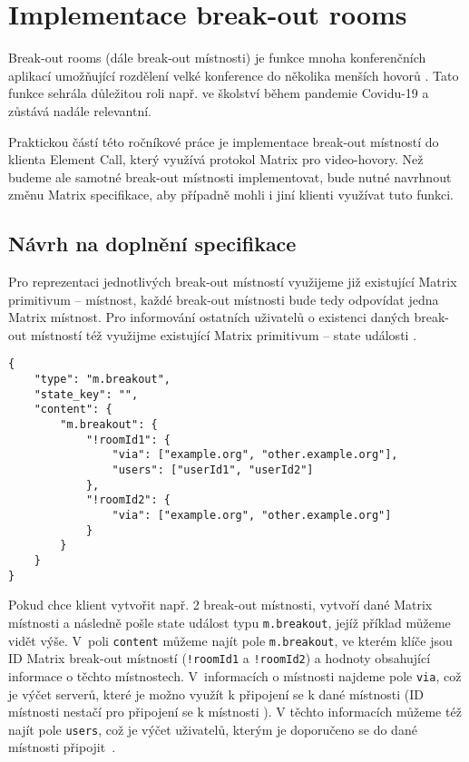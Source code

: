 \section{Implementace break-out rooms}\label{breakoutRooms}

Break-out rooms (dále break-out místnosti) je funkce mnoha konferenčních
aplikací umožňující rozdělení velké konference do několika menších hovorů
\parencite{Zoom-EnablingMeetingBreakoutRooms,Microsoft-UseBreakoutRoomsInMSTeamsMeetings}.
Tato funkce sehrála důležitou roli např. ve školství během pandemie Covidu-19
\parencite{AhmedKhalid-TheImpactOfUtilizingBreakoutRooms,Agustina-ZoomBreakoutRoomsForStudents}
a zůstává nadále relevantní.

Praktickou částí této ročníkové práce je implementace break-out místností do
klienta Element Call, který využívá protokol Matrix pro video-hovory. Než budeme
ale samotné break-out místnosti implementovat, bude nutné navrhnout změnu Matrix
specifikace, aby případně mohli i jiní klienti využívat tuto funkci.

\subsection{Návrh na doplnění specifikace}\label{breakoutRoomsMSC}

Pro reprezentaci jednotlivých break-out místností využijeme již existující
Matrix primitivum -- místnost, každé break-out místnosti bude tedy odpovídat
jedna Matrix místnost. Pro informování ostatních uživatelů o existenci daných
break-out místností též využijme existující Matrix primitivum -- state události
\parencite{GitHub-MSC3985}.

\begin{verbatim}
{
	"type": "m.breakout",
	"state_key": "",
	"content": {
		"m.breakout": {
			"!roomId1": {
				"via": ["example.org", "other.example.org"],
				"users": ["userId1", "userId2"]
			},
			"!roomId2": {
				"via": ["example.org", "other.example.org"]
			}
		}
	}
}
\end{verbatim}

Pokud chce klient vytvořit např. 2 break-out místnosti, vytvoří dané Matrix
místnosti a následně pošle state událost typu \texttt{m.breakout},
jejíž příklad můžeme vidět výše. V~poli \texttt{content} můžeme najít
pole \texttt{m.breakout}, ve kterém klíče jsou ID Matrix break-out
místností (\texttt{!roomId1} a \texttt{!roomId2}) a hodnoty
obsahující informace o těchto místnostech. V~informacích o místnosti najdeme
pole \texttt{via}, což je výčet serverů, které je možno využít k
připojení se k dané místnosti (ID místnosti nestačí pro připojení se k místnosti
\parencite{MatrixORG-Spec}). V těchto informacích můžeme též najít pole
\texttt{users}, což je výčet uživatelů, kterým je doporučeno se do
dané místnosti připojit~\parencite{GitHub-MSC3985}.

